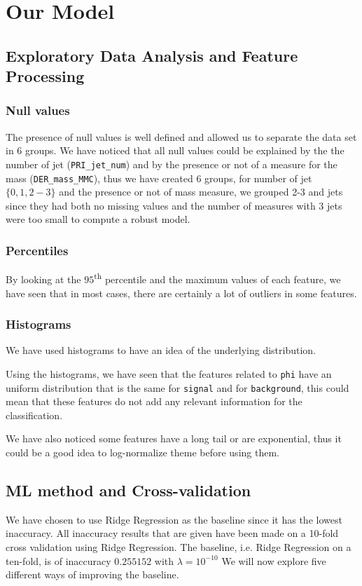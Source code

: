 \documentclass[10pt,conference,compsocconf]{IEEEtran}
\begin{document}
\section{Our Model}
\subsection{Exploratory Data Analysis and Feature Processing}
\subsubsection{Null values}
The presence of null values is well defined and allowed us to separate the
data set in 6 groups. We have noticed that all null values could be
explained by the the number of jet (\texttt{PRI\_jet\_num}) and by the presence
or not of a measure for the mass (\texttt{DER\_mass\_MMC}), thus we have created
6 groups, for number of jet $\lbrace 0, 1, 2-3 \rbrace$ and the presence or not
of mass measure, we grouped 2-3 and jets since they had both no missing values
and the number of measures with 3 jets were too small to compute a robust model.

\subsubsection{Percentiles}

By looking at the $95$\textsuperscript{th} percentile and the maximum values of
each feature, we have seen that in most cases, there are certainly a lot of
outliers in some features.

\subsubsection{Histograms}

We have used histograms to have an idea of the underlying distribution.

Using the histograms, we have seen that the features related to \texttt{phi} have an
uniform distribution that is the same for \texttt{signal} and for
\texttt{background}, this could mean that these features do not add any relevant
information for the classification.

We have also noticed some features have a long tail or are exponential, thus it
could be a good idea to log-normalize theme before using them.

\subsection{ML method and Cross-validation}
We have chosen to use Ridge Regression as the baseline since it has the lowest
inaccuracy.
All inaccuracy results that are given have been made on a 10-fold cross validation
using Ridge Regression. The baseline, i.e. Ridge Regression on a ten-fold, is
of inaccuracy $0.255152$ with $\lambda = 10^{-10}$
We will now explore five different ways of improving the baseline.
\end{document}

